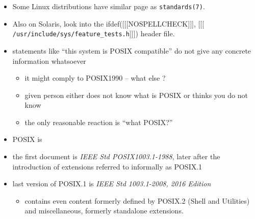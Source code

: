 \begin{itemize}
lots of information about standards can be found in one place.
Individual commands compliant to the standard are moreover placed
into special directories, e.g. the \texttt{tr} program is located in
\texttt{/usr/xpg4/bin/} and \texttt{/usr/xpg6/bin/} directories, in each there
is a version of the program compliant to the respective standard.
The options and behavior specified by the standard can be then relied upon e.g.
when writing shell scripts.
\item Some Linux distributions have similar page as \texttt{standards(7)}.
\item Also on Solaris, look into the
ifdef([[[NOSPELLCHECK]]], [[[
\texttt{/usr/inc{}lude/sys/fea\-ture\-\_tests.h}]]]) header file.
\end{itemize}



\begin{slide}
\begin{itemize}
\renewcommand{\baselinestretch}{0.8}
\item statements like ``this system is POSIX compatible'' do not give any
concrete information whatsoever
\begin{itemize}
\item it might comply to POSIX1990 -- what else ?
\item given person either does not know what is POSIX or thinks you do not know
\item the only reasonable reaction is ``what POSIX?''
\end{itemize}
\item POSIX is 
\item the first document is \emph{IEEE Std POSIX1003.1-1988}, later after the
introduction of extensions referred to informally as POSIX.1
\item last version of POSIX.1 is \emph{IEEE Std 1003.1-2008, 2016 Edition}
\begin{itemize}
\item contains even content formerly defined by POSIX.2 (Shell and Utilities)
and miscellaneous, formerly standalone extensions.
\end{itemize}
\end{itemize}
\end{slide}


